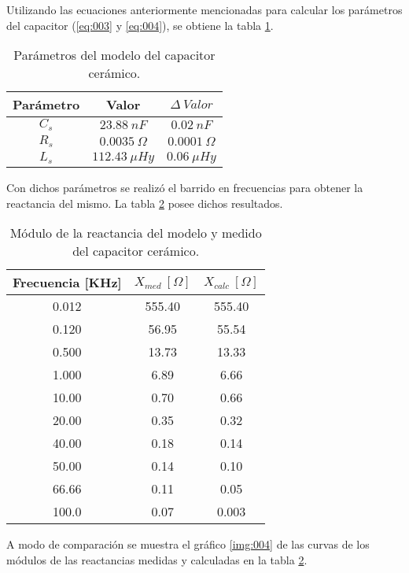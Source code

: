 \documentclass[a4paper,10pt]{article}
\begin{document}
		\indent Utilizando las ecuaciones anteriormente mencionadas para 
		calcular los parámetros del capacitor (\ref{eq:003} y \ref{eq:004}), se 
		obtiene la tabla \ref{tab:012}.

		\begin{table}[!htp]
			\centering
			\begin{tabular}{|c|c|c|}
				\hline
				Parámetro & Valor & $\Delta~Valor$ \\ 
				\hline
				$C_s$ &	$23.88~nF$ & $0.02~nF$ \\
				\hline
				$R_s$ &	$0.0035~\Omega$ & $0.0001~\Omega$ \\
				\hline
				$L_s$ &	$112.43~\mu Hy$ & $0.06~\mu Hy$ \\
				\hline
			\end{tabular}
			\caption{Parámetros del modelo del capacitor cerámico.}
			\label{tab:012}
		\end{table}

		\indent Con dichos parámetros se realizó el barrido en frecuencias 
		para obtener la reactancia del mismo. La tabla \ref{tab:013} posee 
		dichos resultados.

		\begin{table}[!htp]
			\centering
			\begin{tabular}{|c|c|c|}
				\hline
				Frecuencia [KHz] & $X_{med}~[\Omega]$ & $X_{calc}~[\Omega]$ \\
				\hline
				0.012 &	555.40 & 555.40 \\
				\hline
				0.120 &	56.95 & 55.54 \\
				\hline
				0.500 &	13.73 & 13.33 \\
				\hline
				1.000 &	6.89 & 6.66 \\
				\hline
				10.00 &	0.70 & 0.66 \\
				\hline
				20.00 &	0.35 & 0.32 \\
				\hline
				40.00 & 0.18 & 0.14 \\
				\hline
				50.00 & 0.14 & 0.10 \\
				\hline
				66.66 &	0.11 & 0.05 \\
				\hline
				100.0 &	0.07 & 0.003 \\
				\hline	  
			\end{tabular}
			\caption{Módulo de la reactancia del modelo y medido del capacitor 
			cerámico.}
			\label{tab:013}
		\end{table}

		\indent A modo de comparación se muestra el gráfico \ref{img:004} de las
		curvas de los módulos de las reactancias medidas y calculadas en la 
		tabla \ref{tab:013}.
\end{document}
